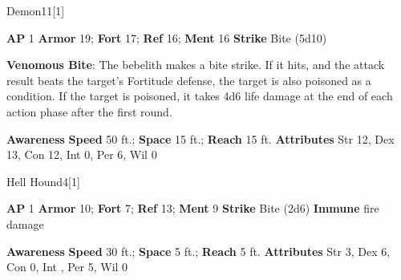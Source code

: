 \begin{monsection}[Bebelith]{Demon}{11}[1]
\vspace{-1em}\vspace{-1em}
\begin{spellcontent}
\begin{spelltargetinginfo}
{\textbf{AP} 1}
\pari \textbf{Armor} 19;
\textbf{Fort} 17;
\textbf{Ref} 16;
\textbf{Ment} 16
\pari \textbf{Strike} Bite  (5d10)
\end{spelltargetinginfo}
\begin{spelleffects}
\pari
\textbf{Venomous Bite}:
The bebelith makes a bite strike.
If it hits, and the attack result beats the target's Fortitude defense, the target is also poisoned as a condition.
If the target is poisoned, it takes 4d6 life damage at the end of each action phase after the first round.
\end{spelleffects}
\end{spellcontent}
\begin{spellsubcontent}
\begin{spellfooter}
\pari \textbf{Awareness} 
\pari \textbf{Speed} 50 ft.;
\textbf{Space} 15 ft.;
\textbf{Reach} 15 ft.
\pari \textbf{Attributes}
Str 12,
Dex 13,
Con 12,
Int 0,
Per 6,
Wil 0
\end{spellfooter}
\end{spellsubcontent}
\end{monsection}
\begin{monsection}{Hell Hound}{4}[1]
\vspace{-1em}\vspace{-1em}
\begin{spellcontent}
\begin{spelltargetinginfo}
{\textbf{AP} 1}
\pari \textbf{Armor} 10;
\textbf{Fort} 7;
\textbf{Ref} 13;
\textbf{Ment} 9
\pari \textbf{Strike} Bite  (2d6)
\pari \textbf{Immune} fire damage
\end{spelltargetinginfo}
\end{spellcontent}
\begin{spellsubcontent}
\begin{spellfooter}
\pari \textbf{Awareness} 
\pari \textbf{Speed} 30 ft.;
\textbf{Space} 5 ft.;
\textbf{Reach} 5 ft.
\pari \textbf{Attributes}
Str 3,
Dex 6,
Con 0,
Int ,
Per 5,
Wil 0
\end{spellfooter}
\end{spellsubcontent}
\end{monsection}
